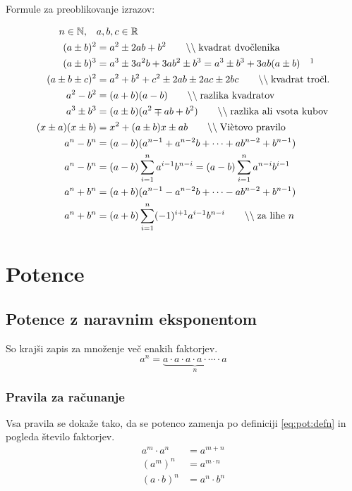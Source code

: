 \documentclass[a4paper,oneside,12pt,fleqn]{article}
\def\R{\ensuremath{\mathbb R}}
\def\N{\ensuremath{\mathbb N}}
\newcommand\krat\cdot
\newcommand{\comment}[1]{\ensuremath{\qquad\backslash\backslash\;}\textnormal{#1}}
\numberwithin{equation}{section}
\begin{document}
Formule za preoblikovanje izrazov:\\
\parbox{\textwidth}{
\begin{align}
   n \in \N, \quad & a, b, c \in \R \nonumber \\
   \label{eq:izr:kvadrat:dvoclenika} (a \pm b)^2 &= a^2 \pm 2ab + b^2 \comment{kvadrat
   dvočlenika} \\
   \label{eq:izr:kub:dvoclenika} (a \pm b)^3 &= a^3 \pm 3a^2b + 3ab^2 \pm b^3 = a^3 \pm
   b^3 + 3ab(a\pm b) \quad \footnotemark \\
   \label{eq:izr:kvadrat:troclenika} (a \pm b \pm c)^2 &= a^2 + b^2 + c^2 \pm 2ab \pm 2ac
   \pm 2bc \comment{kvadrat tročl.} \\
   \label{eq:izr:razlikakvadratov} a^2 - b^2 &= (a+b)(a-b) \comment{razlika kvadratov} \\
   \label{eq:izr:vsotakubov} a^3 \pm b^3 &= (a \pm b)(a^2 \mp ab + b^2) \comment{razlika ali
   vsota kubov} \\
   \label{eq:izr:vietovo} (x\pm a)(x\pm b) &= x^2 + (a\pm b)x \pm ab \comment{Vi\`{e}tovo
   pravilo} \\
   \label{eq:izr:ananminusbnan} a^n - b^n &= (a - b)(a^{n-1} + a^{n-2}b + \cdots
   + ab^{n-2} + b^{n-1}) \\ 
   a^n - b^n &= (a - b)\sum_{i=1}^{n} a^{i-1}b^{n-i} = (a - b)\sum_{i=1}^{n} a^{n-i}b^{i-1} \nonumber \\
   \label{eq:izr:ananplubnan}  a^n + b^n &=  (a + b)(a^{n-1} - a^{n-2}b + \cdots
   - ab^{n-2} + b^{n-1}) \\
   a^n +b^n &= (a+b)\sum_{i=1}^{n} (-1)^{i+1}a^{i-1}b^{n-i} \comment{za lihe $n$} \nonumber
\end{align}
}

\section{Potence}
\label{sec:pot}
\subsection{Potence z naravnim eksponentom}
\label{sec:pot:nar}
So krajši zapis za množenje več enakih faktorjev.
\begin{equation}
    a^n = \underbrace{a \krat a \krat a \krat a \krat \cdots \krat a}_n
    \label{eq:pot:defn}
\end{equation}

\subsubsection{Pravila za računanje}
\label{sec:pot:nar:prav}
Vsa pravila se dokaže tako, da se potenco zamenja po definiciji \eqref{eq:pot:defn} in
pogleda število faktorjev.
\begin{align}
  a^m \krat a^n &= a^{m+n} \label{eq:pot:anankratanam} \\
  (a^m)^n &= a^{m\krat n} \label{eq:pot:anannam} \\
  (a\krat b)^n &= a^n \krat b^n \label{eq:pot:akratbnan}
\end{align}
\end{document}
